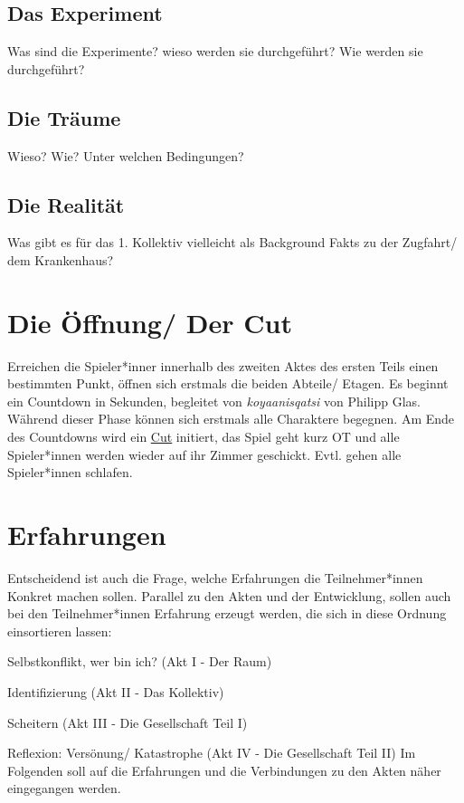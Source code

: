 \documentclass[12pt, a4paper, openany]{report}
\let\tempone\itemize
\let\temptwo\enditemize
\renewenvironment{itemize}{\tempone\addtolength{\itemsep}{-0.5\baselineskip}}{\temptwo}
\begin{document}
\subsection{Das Experiment}
Was sind die Experimente? wieso werden sie durchgeführt? Wie werden sie durchgeführt?

\subsection{Die Träume}
Wieso? Wie? Unter welchen Bedingungen?

\subsection{Die Realität}
Was gibt es für das 1. Kollektiv vielleicht als Background Fakts zu der Zugfahrt/ dem Krankenhaus?



\section{Die Öffnung/ Der Cut} \label{die-öffnung}
Erreichen die Spieler*inner innerhalb des zweiten Aktes des ersten Teils einen bestimmten Punkt, öffnen sich erstmals die beiden Abteile/ Etagen. 
Es beginnt ein Countdown in Sekunden, begleitet von \textit{koyaanisqatsi} von Philipp Glas. 
Während dieser Phase können sich erstmals alle Charaktere begegnen. 
Am Ende des Countdowns wird ein \hyperref[cut]{Cut} initiert, das Spiel geht kurz OT und alle Spieler*innen werden wieder auf ihr Zimmer geschickt. 
Evtl. gehen alle Spieler*innen schlafen.  

\section{Erfahrungen}
Entscheidend ist auch die Frage, welche Erfahrungen die Teilnehmer*innen Konkret machen sollen.
Parallel zu den Akten und der Entwicklung, sollen auch bei den Teilnehmer*innen Erfahrung erzeugt werden, die sich in diese Ordnung einsortieren lassen:
\begin{itemize}
\item Selbstkonflikt, wer bin ich? (Akt I - Der Raum)
\item Identifizierung (Akt II - Das Kollektiv)
\item Scheitern (Akt III - Die Gesellschaft Teil I)
\item Reflexion: Versönung/ Katastrophe (Akt IV - Die Gesellschaft Teil II)
Im Folgenden soll auf die Erfahrungen und die Verbindungen zu den Akten näher eingegangen werden.
\end{itemize}
\end{document}
